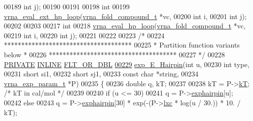 \begin{DoxyCode}
00189                    \textcolor{keywordtype}{int}                  j);
00190 
00191 
00198 \textcolor{keywordtype}{int}
00199 \mbox{\hyperlink{group__loops_gad3b92453a6b501856eec8fae39f3235d}{vrna\_eval\_ext\_hp\_loop}}(\mbox{\hyperlink{group__fold__compound_structvrna__fc__s}{vrna\_fold\_compound\_t}}  *vc,
00200                       \textcolor{keywordtype}{int}                   i,
00201                       \textcolor{keywordtype}{int}                   j);
00202 
00203 
00217 \textcolor{keywordtype}{int}
00218 \mbox{\hyperlink{group__loops_gab3eb4651dc26dc2b653a57dd340d7e68}{vrna\_eval\_hp\_loop}}(\mbox{\hyperlink{group__fold__compound_structvrna__fc__s}{vrna\_fold\_compound\_t}}  *vc,
00219                   \textcolor{keywordtype}{int}                   i,
00220                   \textcolor{keywordtype}{int}                   j);
00221 
00222 
00223 \textcolor{comment}{/*}
00224 \textcolor{comment}{ *************************************}
00225 \textcolor{comment}{ * Partition function variants below *}
00226 \textcolor{comment}{ *************************************}
00227 \textcolor{comment}{ */}
00228 \mbox{\hyperlink{edit__cost_8h_a5e151c615eda34903514212f05a5ccf8}{PRIVATE}} \mbox{\hyperlink{hairpin__loops_8h_a2eb6f9e0395b47b8d5e3eeae4fe0c116}{INLINE}} \mbox{\hyperlink{group__data__structures_ga31125aeace516926bf7f251f759b6126}{FLT\_OR\_DBL}}
\mbox{\hyperlink{group__loops_ga51fb555974f180b78d76142b2894851c}{00229}} \mbox{\hyperlink{group__loops_ga51fb555974f180b78d76142b2894851c}{exp\_E\_Hairpin}}(\textcolor{keywordtype}{int}               u,
00230               \textcolor{keywordtype}{int}               type,
00231               \textcolor{keywordtype}{short}             si1,
00232               \textcolor{keywordtype}{short}             sj1,
00233               \textcolor{keyword}{const} \textcolor{keywordtype}{char}        *\textcolor{keywordtype}{string},
00234               \mbox{\hyperlink{group__energy__parameters_structvrna__exp__param__s}{vrna\_exp\_param\_t}}  *P)
00235 \{
00236   \textcolor{keywordtype}{double} q, kT;
00237 
00238   kT = P->\mbox{\hyperlink{group__energy__parameters_aee22f89eac71caf2bac24cc795de17aa}{kT}};   \textcolor{comment}{/* kT in cal/mol  */}
00239 
00240   \textcolor{keywordflow}{if} (u <= 30)
00241     q = P->\mbox{\hyperlink{group__energy__parameters_a7d770c6dbf7bd37b91f56600d387b0cd}{exphairpin}}[u];
00242   \textcolor{keywordflow}{else}
00243     q = P->\mbox{\hyperlink{group__energy__parameters_a7d770c6dbf7bd37b91f56600d387b0cd}{exphairpin}}[30] * exp(-(P->\mbox{\hyperlink{group__energy__parameters_acbceb6027e4aa73cf216712617d8ab02}{lxc}} * log(u / 30.)) * 10. / kT);

\end{DoxyCode}
